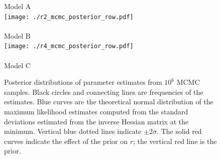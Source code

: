 \documentclass[12pt,letterpaper]{article}
\begin{document}
\begin{figure}
\begin{center}
{\sffamily
Model A\\
\texttt{[image: ./r2\_mcmc\_posterior\_row.pdf]}\\
~\\
Model B\\
\texttt{[image: ./r4\_mcmc\_posterior\_row.pdf]}\\
~\\
Model C\\
}
\end{center}
\caption{Posterior distributions of parameter estimates from $10^6$
MCMC samples. 
Black circles and connecting lines are frequencies of the estimates.
Blue curves are the theoretical normal distribution of the maximum
likelihood estimates computed from the standard deviations estimated
from the inverse Hessian matrix at the minimum. 
Vertical blue dotted lines indicate $\pm 2\sigma$.
The solid red curves indicate the effect of the prior on $r$; the
vertical red line is the prior.
\label{fig:posteriors}}
\end{figure}
\end{document}

